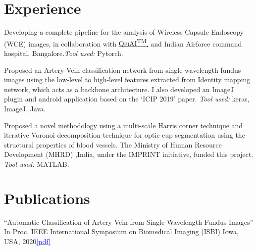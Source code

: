 \documentclass[11pt,a4paper,sans]{moderncv} %
\begin{document}

\section{Experience}

		{}
		{Developing a complete pipeline for the analysis of Wireless Capsule Endoscopy (WCE)
			images, in collaboration with \href{https://qpiai.tech/}{\textsc{QpiAI\textsuperscript{TM}}.}
		and Indian Airforce command hospital, Bangalore.\textit{Tool used:} Pytorch.}

		{}
		{Proposed an Artery-Vein classification network from single-wavelength fundus
		images using the low-level to high-level features extracted from Identity mapping network,
	which acts as a backbone architecture. I also developed an ImageJ plugin and android
application based on the ‘ICIP 2019’ paper.
		\textit{Tool used:} keras, ImageJ, Java.}


		{}
		{Proposed a novel methodology using a multi-scale Harris corner technique and
		iterative Voronoi decomposition technique for optic cup segmentation using the structural
	properties of blood vessels. The Ministry of Human Resource Development (MHRD) ,India,
under the IMPRINT initiative, funded this project. \textit{Tool used:} MATLAB.}


\section{Publications}

				{``Automatic Classification of Artery-Vein from Single Wavelength Fundus Images''}
				{In Proc. IEEE International Symposium on Biomedical Imaging (ISBI)}
				{Iowa, USA, 2020}{\href{https://ieeexplore.ieee.org/abstract/document/9098580}{\textcolor{blue}{[pdf]}}}
\end{document}

